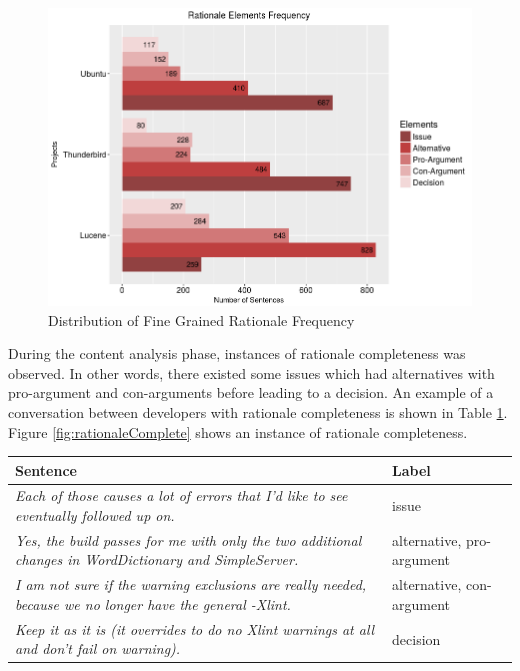 \documentclass[a4paper,12pt,twoside]{report}
\begin{document}
\begin{figure}[H] %
    \centering
    \includegraphics[width=13cm]{multi-distro-rationale}
    \caption{Distribution of Fine Grained Rationale Frequency}
    \label{fig:distroMultiRationale}
\end{figure}
\noindent
During the content analysis phase, instances of rationale completeness was observed. In other words, there existed some issues which had alternatives with pro-argument and con-arguments before leading to a decision. An example of a conversation between developers with rationale completeness is shown in Table \ref{tab:rationaleExample}. Figure \ref{fig:rationaleComplete} shows an instance of rationale completeness. 
\begin{table} [H]%
    \centering
    \begin{adjustbox}{max width=\columnwidth}
    \def\arraystretch{1} %
    \begin{tabular}{p{10cm} p{5cm}}
        \toprule
        \textbf{Sentence} & \textbf{Label}\\
        \midrule
			\textit{Each of those causes a lot of errors that I'd like to see eventually followed up on.} & issue\\
			\midrule
			\textit{Yes, the build passes for me with only the two additional changes in WordDictionary and SimpleServer.} & alternative, pro-argument \\ 
			\midrule
			\textit{I am not sure if the warning exclusions are really needed, because we no longer have the general -Xlint.} & alternative, con-argument \\ 
			\midrule
			\textit{Keep it as it is (it overrides to do no Xlint warnings at all and don't fail on warning).} & decision \\ 
        \midrule
    \end{tabular}
    \end{adjustbox}
    \label{tab:rationaleExample}
\end{table}
\end{document}
